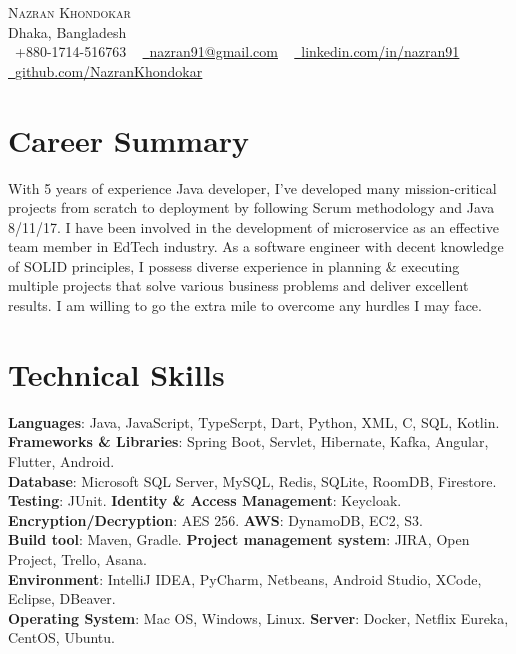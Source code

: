 \documentclass[letterpaper,11pt]{article}
\begin{document}

\begin{center}
    {\Huge \scshape Nazran Khondokar} \\ \vspace{1pt}
    Dhaka, Bangladesh \\ \vspace{1pt}
    \small \raisebox{-0.1\height}\faPhone\ +880-1714-516763 ~ \href{mailto:nazran91@gmail.com}{\raisebox{-0.2\height}\faEnvelope\  \underline{nazran91@gmail.com}} ~ 
    \href{https://www.linkedin.com/in/nazran91/}{\raisebox{-0.2\height}\faLinkedin\ \underline{linkedin.com/in/nazran91}}  ~
    \href{https://github.com/NazranKhondokar/}{\raisebox{-0.2\height}\faGithub\ \underline{github.com/NazranKhondokar}}
    \vspace{-8pt}
\end{center}

\section{Career Summary}
With 5 years of experience Java developer, I’ve developed many mission-critical projects from scratch to deployment by following Scrum methodology and Java 8/11/17. I have been involved in the development of microservice as an effective team member in EdTech industry. As a software engineer with decent knowledge of SOLID principles, I possess diverse experience in planning \& executing multiple projects that solve various business problems and deliver excellent results. I am willing to go the extra mile to overcome any hurdles I may face.
            

%
\section{Technical Skills}
 \begin{itemize}[leftmargin=0.15in, label={}]
    \small{\item{
     \textbf{Languages}{: Java, JavaScript, TypeScrpt, Dart, Python, XML, C, SQL, Kotlin.} \\
     \textbf{Frameworks \& Libraries}{: Spring Boot, Servlet, Hibernate, Kafka, Angular, Flutter, Android.}\\
     \textbf{Database}{: Microsoft SQL Server, MySQL, Redis, SQLite, RoomDB, Firestore.}\\
     \textbf{Testing}{: JUnit.}
     \textbf{Identity \& Access Management}{: Keycloak.}\\
     \textbf{Encryption/Decryption}{: AES 256.}
     \textbf{AWS}{: DynamoDB, EC2, S3.}\\
     \textbf{Build tool}{: Maven, Gradle.}
     \textbf{Project management system}{: JIRA, Open Project, Trello, Asana.}\\
     \textbf{Environment}{: IntelliJ IDEA, PyCharm, Netbeans, Android Studio, XCode, Eclipse, DBeaver.}\\
     \textbf{Operating System}{: Mac OS, Windows, Linux.}
     \textbf{Server}{: Docker, Netflix Eureka, CentOS, Ubuntu.}
    }}
 \end{itemize}
 \vspace{-16pt}
\end{document}
